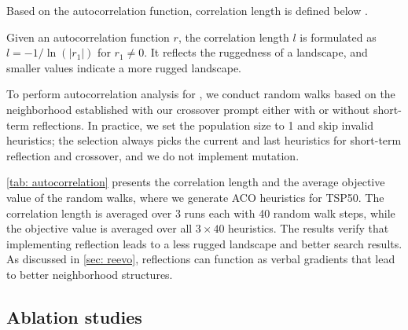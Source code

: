 Based on the autocorrelation function, correlation length is defined below \cite{weinberger1990correlation_length}.


\begin{definition}
    Given an autocorrelation function \( r \), the correlation length \(l\) is formulated as $l = -1/\ln(|r_1|)$ for $r_1 \neq 0$. It reflects the ruggedness of a landscape, and smaller values indicate a more rugged landscape.
\end{definition}


To perform autocorrelation analysis for \our{}, we conduct random walks based on the neighborhood established with our crossover prompt either with or without short-term reflections. In practice, we set the population size to 1 and skip invalid heuristics; the selection always picks the current and last heuristics for short-term reflection and crossover, and we do not implement mutation.


\vspace{-2mm}
\begin{table}
    \footnotesize
    \caption{Autocorrelation analysis of \our{}.}
    \label{tab: autocorrelation}
    \vspace{-2mm} 
\end{table} 
\cref{tab: autocorrelation} presents the correlation length and the average objective value of the random walks, where we generate ACO heuristics for TSP50. The correlation length is averaged over 3 runs each with 40 random walk steps, while the objective value is averaged over all \(3 \times 40\) heuristics. The results verify that implementing reflection leads to a less rugged landscape and better search results. As discussed in \cref{sec: reevo}, reflections can function as verbal gradients that lead to better neighborhood structures.

\subsection{Ablation studies} \label{app: ablation studies}

